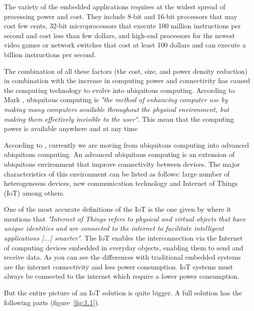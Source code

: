 The variety of the embedded applications requires at the widest spread
of processing power and cost. They include 8-bit and 16-bit processors that may
cost few cents, 32-bit microprocessors that execute 100 million instructions
per second and cost less than few dollars, and high-end processors for the
newest video games or network switches that cost at least 100 dollars and can
execute a billion instructions per second.\cite{Hennessy}

The combination of all these factors (the cost, size, and power density
reduction) in combination with the increase in computing power and connectivity
has caused the computing technology to evolve into ubiquitous computing.
According to Mark \cite{Mark}, ubiquitous computing is \textit{"the method of
enhancing computer use by making many computers available throughout the
physical environment, but making them effectively invisible to the user"}. This
mean that the computing power is available anywhere and at any time


According to \cite{Nur}, currently we are moving from ubiquitous computing into
advanced ubiquitous computing. An advanced ubiquitous computing is an extension
of ubiquitous environment that improve connectivity between devices. The major
characteristics of this environment can be listed as follows: large number of
heterogeneous devices, new communication technology  and Internet of Things
(IoT) among others.


One of the most accurate definitions of the IoT is the one given by
\cite{Bahga} where it mentions that \textit{"Internet of Things refers to
physical and virtual objects that have unique identities and are connected to
the internet to facilitate intelligent applications [...] smarter"}. The IoT
enables the interconnection via the Internet of computing devices embedded in
everyday objects, enabling them to send and receive data. As you can see the
differences with traditional embedded systems are the internet connectivity and
less power consumption. IoT systems must always be connected to the internet
which require a lower power consumption.

But the entire picture of an IoT solution is quite bigger. A full solution has 
the following parts (figure~\ref{fig:1.1}).

